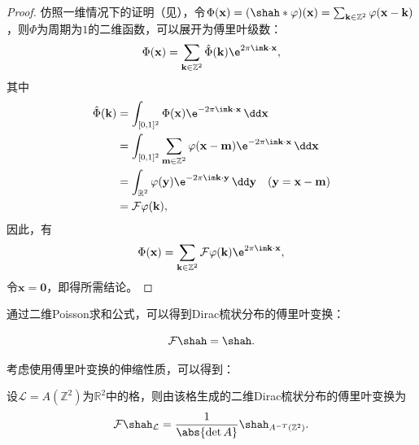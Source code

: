 \begin{proof}
    仿照一维情况下的证明（见），令$\Phi(\mathbf{x})=(\shah*\varphi)(\mathbf{x})=\sum_{\mathbf{k}\in\mathbb{Z}^2}\varphi(\mathbf{x}-\mathbf{k})$，则$\Phi$为周期为$1$的二维函数，可以展开为傅里叶级数：
    \begin{equation}
        \Phi(\mathbf{x})=\sum_{\mathbf{k}\in\mathbb{Z}^2}\hat{\Phi}(\mathbf{k})\e^{2\pi\im\mathbf{k}\cdot\mathbf{x}},
    \end{equation}
    其中
    \begin{align}
        \hat{\Phi}(\mathbf{k})&=\int_{[0,1]^2}\Phi(\mathbf{x})\e^{-2\pi\im\mathbf{k}\cdot\mathbf{x}}\,\dd\mathbf{x}\nonumber\\
        &=\int_{[0,1]^2}\sum_{\mathbf{m}\in\mathbb{Z}^2}\varphi(\mathbf{x}-\mathbf{m})\e^{-2\pi\im\mathbf{k}\cdot\mathbf{x}}\,\dd\mathbf{x}\nonumber\\
        &=\int_{\mathbb{R}^2}\varphi(\mathbf{y})\e^{-2\pi\im\mathbf{k}\cdot\mathbf{y}}\,\dd\mathbf{y}\quad(\mathbf{y}=\mathbf{x}-\mathbf{m})\nonumber\\
        &=\mathcal{F}\varphi(\mathbf{k}),
    \end{align}
    因此，有
    \begin{equation}
        \Phi(\mathbf{x})=\sum_{\mathbf{k}\in\mathbb{Z}^2}\mathcal{F}\varphi(\mathbf{k})\e^{2\pi\im\mathbf{k}\cdot\mathbf{x}},
    \end{equation}
    令$\mathbf{x}=\mathbf{0}$，即得所需结论。
\end{proof}

通过二维Poisson求和公式，可以得到Dirac梳状分布的傅里叶变换：
\begin{proposition}[二维Dirac梳状分布的傅里叶变换]
    \begin{equation}
        \mathcal{F}\shah=\shah.
    \end{equation}
\end{proposition}

考虑使用傅里叶变换的伸缩性质，可以得到：
\begin{proposition}
    设$\mathcal{L}=A(\mathbb{Z}^2)$为$\mathbb{R}^2$中的格，则由该格生成的二维Dirac梳状分布的傅里叶变换为
    \begin{equation}
        \mathcal{F}\shah_{\mathcal{L}}=\frac{1}{\abs{\det A}}\shah_{A^{-T}(\mathbb{Z}^2)}.
    \end{equation}
\end{proposition}

